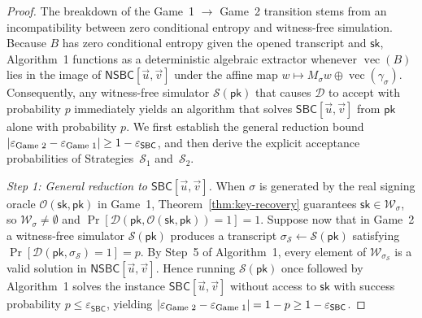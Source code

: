 \documentclass[11pt,a4paper]{article}
\theoremstyle{definition}
\theoremstyle{remark}
\newcommand{\SBC}{\mathsf{SBC}}
\newcommand{\NSBC}{\mathsf{NSBC}}
\newcommand{\pk}{\mathsf{pk}}
\newcommand{\sk}{\mathsf{sk}}
\newcommand{\vecF}{\operatorname{vec}}
\begin{document}
\begin{proof}
The breakdown of the Game~1 $\to$ Game~2 transition stems from an incompatibility between zero conditional entropy and witness-free simulation. Because $B$ has zero conditional entropy given the opened transcript and $\sk$, Algorithm~1 functions as a deterministic algebraic extractor whenever $\vecF(B)$ lies in the image of $\NSBC[\vec{u}, \vec{v}]$ under the affine map $w \mapsto M_\sigma w \oplus \vecF(\gamma_\sigma)$. Consequently, any witness-free simulator $\mathcal{S}(\pk)$ that causes $\mathcal{D}$ to accept with probability $p$ immediately yields an algorithm that solves $\SBC[\vec{u}, \vec{v}]$ from $\pk$ alone with probability $p$. We first establish the general reduction bound $|\varepsilon_{\textup{Game 2}} - \varepsilon_{\textup{Game 1}}| \ge 1 - \varepsilon_{\SBC}$, and then derive the explicit acceptance probabilities of Strategies~$\mathcal{S}_1$ and~$\mathcal{S}_2$.

\smallskip\noindent
\emph{Step 1: General reduction to $\SBC[\vec{u}, \vec{v}]$.}
When $\sigma$ is generated by the real signing oracle $\mathcal{O}(\sk, \pk)$ in Game~1, Theorem~\ref{thm:key-recovery} guarantees $\sk \in \mathcal{W}_\sigma$, so $\mathcal{W}_\sigma \neq \emptyset$ and $\Pr[\mathcal{D}(\pk, \mathcal{O}(\sk, \pk)) = 1] = 1$. Suppose now that in Game~2 a witness-free simulator $\mathcal{S}(\pk)$ produces a transcript $\sigma_{\mathcal{S}} \leftarrow \mathcal{S}(\pk)$ satisfying $\Pr[\mathcal{D}(\pk, \sigma_{\mathcal{S}}) = 1] = p$. By Step~5 of Algorithm~1, every element of $\mathcal{W}_{\sigma_{\mathcal{S}}}$ is a valid solution in $\NSBC[\vec{u}, \vec{v}]$. Hence running $\mathcal{S}(\pk)$ once followed by Algorithm~1 solves the instance $\SBC[\vec{u}, \vec{v}]$ without access to $\sk$ with success probability $p \le \varepsilon_{\SBC}$, yielding $|\varepsilon_{\textup{Game 2}} - \varepsilon_{\textup{Game 1}}| = 1 - p \ge 1 - \varepsilon_{\SBC}$.


\end{proof}
\end{document}
